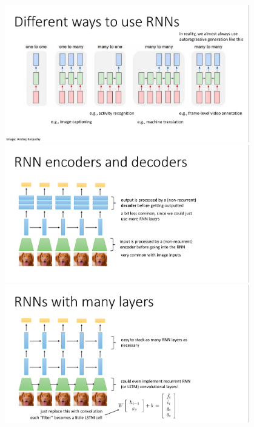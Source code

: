 \documentclass{book}
\begin{document}
\begin{figure}[H]
    \centering
    \includegraphics[width=0.95\textwidth]{images/lec10_22.png}
    \includegraphics[width=0.95\textwidth]{images/lec10_23.png}
    \includegraphics[width=0.95\textwidth]{images/lec10_24.png}
\end{figure}
\end{document}
